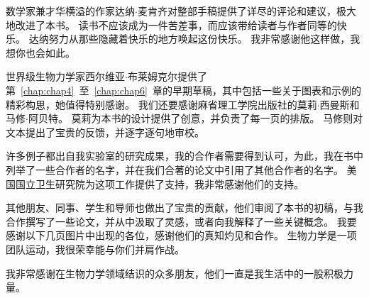 \documentclass[cn,10pt,citestyle=gb7714-2015, bibstyle=gb7714-2015]{elegantbook}
\begin{document}
数学家兼才华横溢的作家达纳$\cdot$麦肯齐对整部手稿提供了详尽的评论和建议，极大地改进了本书。
读书不应该成为一件苦差事，而应该带给读者与作者同等的快乐。
达纳努力从那些隐藏着快乐的地方唤起这份快乐。
我非常感谢他这样做，我想你也会如此。


世界级生物力学家西尔维亚$\cdot$布莱姆克尔提供了第~\ref{chap:chap4}~至~\ref{chap:chap6}~章的早期草稿，其中包括一些关于图表和示例的精彩构思，她值得特别感谢。
我们还要感谢麻省理工学院出版社的莫莉$\cdot$西曼斯和马修$\cdot$阿贝特。
莫莉为本书的设计提供了创意，并负责了每一页的排版。
马修则对文本提出了宝贵的反馈，并逐字逐句地审校。



许多例子都出自我实验室的研究成果，我的合作者需要得到认可，为此，我在书中列举了一些合作者的名字，并在我们合著的论文中引用了其他合作者的名字。
美国国立卫生研究院为这项工作提供了支持，我非常感谢他们的支持。


其他朋友、同事、学生和导师也做出了宝贵的贡献，他们审阅了本书的初稿，与我合作撰写了一些论文，并从中汲取了灵感，或者向我解释了一些关键概念。
我要感谢以下几页图片中出现的各位，感谢他们的真知灼见和合作。
生物力学是一项团队运动，我很荣幸能与你们并肩作战。



我非常感谢在生物力学领域结识的众多朋友，他们一直是我生活中的一股积极力量。




\tableofcontents

\mainmatter




















\nocite{*} 
\printbibliography
\end{document}
